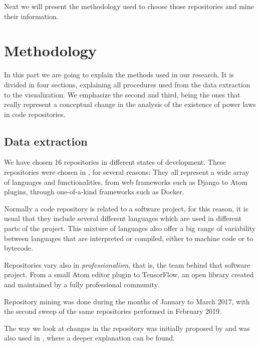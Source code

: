 \documentclass[conference]{IEEEtran}
\begin{document}
Next we will present the methodology used to choose those repositories
and mine their information.




\section{Methodology}
\label{sec:method}

In this part we are going to explain the methods used in our
research. It is divided in four sections, explaining all procedures
used from the data extraction to the visualization. We emphasize the
second and third, being the ones that really represent a conceptual
change in the analysis of the existence of power laws in code
repositories.

\subsection{Data extraction}
We have chosen 16 repositories in different states of development.
These repositories were chosen in \cite{Merelo2016:repomining}, for
several reasons: They all represent a wide array of languages and
functionalities, from web frameworks such as Django to Atom plugins,
through one-of-a-kind frameworks such as Docker.

Normally a code repository is related to a software project, for this
reason, it is usual that they include several different languages
which are used in different parts of the project.  This mixture of
languages also offer a big range of variability between languages that
are interpreted or compiled, either to machine code or to bytecode.

Repositories vary also in {\em professionalism}, that is, the team
behind that software project. From a small Atom editor plugin to
TensorFlow, an open library created and maintained by a fully
professional community.

Repository mining was done during the months of January to March 2017,
with the second sweep of the same repositories performed in February
2019.

The way we look at changes in the repository was initially proposed by
\cite{Merelo2016:repomining} and was also used in
\cite{merelo2017self}, where a deeper explanation can be found.
\end{document}

